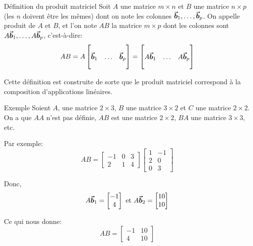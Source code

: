 \documentclass[a4paper]{article}
\begin{document}
\begin{parag}{Définition du produit matriciel}
    Soit $A$ une matrice $m \times n$ et $B$ une matrice $n \times p$ (les $n$ doivent être les mêmes) dont on note les colonnes $\bm{\protect\vec{b}}_1, \ldots, \bm{\protect\vec{b}}_p$. On appelle produit de $A$ et $B$, et l'on note $AB$ la matrice $m \times p$ dont les colonnes sont $A \bm{\protect\vec{b}}_1, \ldots, A \bm{\protect\vec{b}}_p$, c'est-à-dire:
    \[AB = A \begin{bmatrix}  &  &  \\ \bm{\protect\vec{b}}_1 & \ldots & \bm{\protect\vec{b}}_p \\  &  &  \end{bmatrix} = \begin{bmatrix}  &  &  \\ A \bm{\protect\vec{b}}_1 & \ldots & A \bm{\protect\vec{b}}_p \\  &  &  \end{bmatrix} \]

    Cette définition est construite de sorte que le produit matriciel correspond à la composition d'applications linéaires.
\end{parag}

\begin{parag}{Exemple}
    Soient $A$, une matrice $2 \times 3$, $B$ une matrice $3 \times 2$ et $C$ une matrice $2 \times 2$. On a que $A A$ n'est pas définie, $A B$ est une matrice $2 \times 2$, $B A$ une matrice $3 \times 3$, etc.

    Par exemple:
    \[A B = \begin{bmatrix} -1 & 0 & 3 \\ 2 & 1 & 4 \end{bmatrix} \begin{bmatrix} 1 & -1 \\ 2 & 0 \\ 0 & 3 \end{bmatrix}  \]

    Donc,
    \[A \bm{\protect\vec{b}}_1 = \begin{bmatrix} -1 \\ 4 \end{bmatrix} \text{ et } A \bm{\protect\vec{b}}_2 = \begin{bmatrix} 10 \\ 10 \end{bmatrix} \]

    Ce qui nous donne:
    \[AB = \begin{bmatrix} -1 & 10 \\ 4 & 10 \end{bmatrix} \]
\end{parag}
\end{document}
